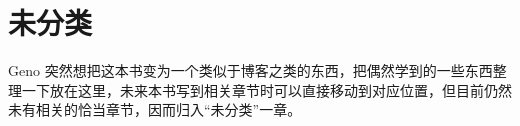 \chapter{未分类}\label{ch:Uncategorized}
    Geno 突然想把这本书变为一个类似于博客之类的东西，把偶然学到的一些东西整理一下放在这里，未来本书写到相关章节时可以直接移动到对应位置，但目前仍然未有相关的恰当章节，因而归入“未分类”一章。
